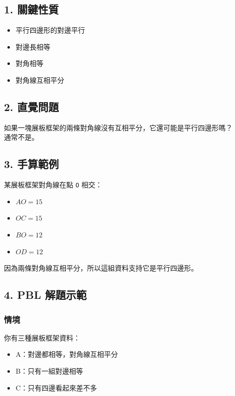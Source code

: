 \documentclass[
  chinese,
  12pt,
  a4paper,
  oneside]{article}
\providecommand{\tightlist}{%
  \setlength{\itemsep}{0pt}\setlength{\parskip}{0pt}}
\begin{document}
\subsection{1. 關鍵性質}\label{ux95dcux9375ux6027ux8cea}

\begin{itemize}
\tightlist
\item
  平行四邊形的對邊平行
\item
  對邊長相等
\item
  對角相等
\item
  對角線互相平分
\end{itemize}

\subsection{2. 直覺問題}\label{ux76f4ux89baux554fux984c-6}

如果一塊展板框架的兩條對角線沒有互相平分，它還可能是平行四邊形嗎？\\
通常不是。

\subsection{3. 手算範例}\label{ux624bux7b97ux7bc4ux4f8b-8}

某展板框架對角線在點 \texttt{O} 相交：

\begin{itemize}
\tightlist
\item
  \(AO = 15\)
\item
  \(OC = 15\)
\item
  \(BO = 12\)
\item
  \(OD = 12\)
\end{itemize}

因為兩條對角線互相平分，所以這組資料支持它是平行四邊形。

\subsection{4. PBL 解題示範}\label{pbl-ux89e3ux984cux793aux7bc4-4}

\subsubsection{情境}\label{ux60c5ux5883-5}

你有三種展板框架資料：

\begin{itemize}
\tightlist
\item
  A：對邊都相等，對角線互相平分
\item
  B：只有一組對邊相等
\item
  C：只有四邊看起來差不多
\end{itemize}
\end{document}

